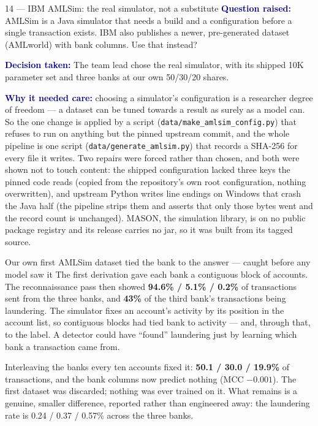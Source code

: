 \documentclass[11pt]{article}
\newcommand{\qlabel}[1]{\textbf{\textcolor{navy}{#1}}\;}
\begin{document}
\begin{decision}{14 --- IBM AMLSim: the real simulator, not a substitute}
\qlabel{Question raised:} AMLSim is a Java simulator that needs a build and a configuration before a
single transaction exists. IBM also publishes a newer, pre-generated dataset (AMLworld) with bank
columns. Use that instead?

\qlabel{Decision taken:} The team lead chose the real simulator, with its shipped 10K parameter set and
three banks at our own 50/30/20 shares.

\qlabel{Why it needed care:} choosing a simulator's configuration is a researcher degree of freedom --- a
dataset can be tuned towards a result as surely as a model can. So the one change is applied by a
script (\texttt{data/make\_amlsim\_config.py}) that refuses to run on anything but the pinned upstream
commit, and the whole pipeline is one script (\texttt{data/generate\_amlsim.py}) that records a SHA-256
for every file it writes. Two repairs were forced rather than chosen, and both were shown not to touch
content: the shipped configuration lacked three keys the pinned code reads (copied from the repository's
own root configuration, nothing overwritten), and upstream Python writes line endings on Windows that
crash the Java half (the pipeline strips them and asserts that only those bytes went and the record
count is unchanged). MASON, the simulation library, is on no public package registry and its release
carries no jar, so it was built from its tagged source.
\end{decision}

\begin{warnbox}{Our own first AMLSim dataset tied the bank to the answer --- caught before any model saw it}
The first derivation gave each bank a contiguous block of accounts. The reconnaissance pass then showed
\textbf{94.6\% / 5.1\% / 0.2\%} of transactions sent from the three banks, and \textbf{43\%} of the third
bank's transactions being laundering. The simulator fixes an account's activity by its position in the
account list, so contiguous blocks had tied bank to activity --- and, through that, to the label. A
detector could have ``found'' laundering just by learning which bank a transaction came from.

Interleaving the banks every ten accounts fixed it: \textbf{50.1 / 30.0 / 19.9\%} of transactions, and the
bank columns now predict nothing (MCC $-0.001$). The first dataset was discarded; nothing was ever
trained on it. What remains is a genuine, smaller difference, reported rather than engineered away: the
laundering rate is 0.24 / 0.37 / 0.57\% across the three banks.
\end{warnbox}
\end{document}
